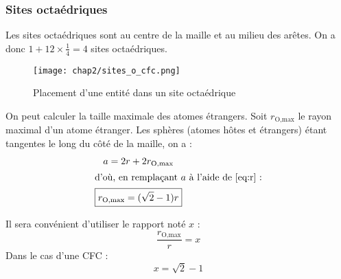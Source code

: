 \subsubsection{Sites octaédriques}
Les sites octaédriques sont au centre de la maille et au milieu
des arêtes. On a donc $1 + 12 \times \frac{1}{4} = 4$ sites octaédriques.
\begin{figure}
    \centering
    \texttt{[image: chap2/sites\_o\_cfc.png]}
    \caption{Placement d'une entité dans un site octaédrique}\label{fig:site_o_cfc}
\end{figure}
On peut calculer la taille maximale des atomes étrangers.
Soit $r_{\text{O,max}}$ le rayon maximal d'un atome étranger.
Les sphères (atomes h\^otes et étrangers) étant tangentes le
long du c\^oté de la maille, on a :
\begin{gather}
    a = 2r + 2r_{\text{O,max}}\\
    \intertext{d'où, en remplaçant $a$ à l'aide de~\ref{eq:r} :}
    \boxed{r_{\text{O,max}} = (\sqrt{2} - 1)r} \label{eq:rmax}
\end{gather}
\begin{rem}
    Il sera convénient d'utiliser le rapport noté $x$ :
    \begin{equation*}
        \frac{r_{\text{O,max}}}{r} = x
    \end{equation*}
    Dans le cas d'une CFC :
    \begin{equation*}
        x = \sqrt{2} - 1
    \end{equation*}
\end{rem}


